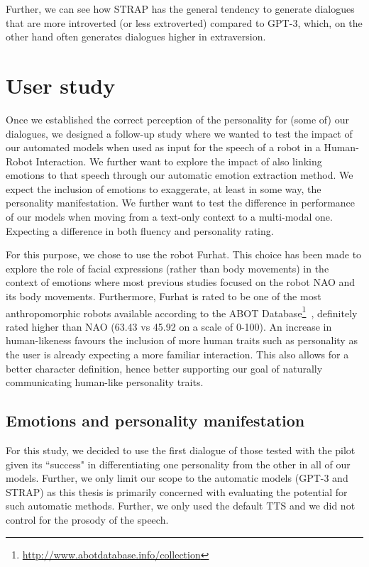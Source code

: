 \documentclass[nomenclature, english, biblatex]{kththesis}
\begin{document}
Further, we can see how STRAP has the general tendency to generate dialogues that are more introverted (or less extroverted) compared to GPT-3, which, on the other hand often generates dialogues higher in extraversion. 
\section{User study}
Once we established the correct perception of the personality for (some of) our dialogues, we designed a follow-up study where we wanted to test the impact of our automated models when used as input for the speech of a robot in a Human-Robot Interaction. We further want to explore the impact of also linking emotions to that speech through our automatic emotion extraction method. We expect the inclusion of emotions to exaggerate, at least in some way, the personality manifestation. We further want to test the difference in performance of our models when moving from a text-only context to a multi-modal one. Expecting a difference in both fluency and personality rating.

For this purpose, we chose to use the robot Furhat. This choice has been made to explore the role of facial expressions (rather than body movements) in the context of emotions where most previous studies focused on the robot NAO and its body movements. Furthermore, Furhat is rated to be one of the most anthropomorphic robots available according to the ABOT Database\footnote{\url{http://www.abotdatabase.info/collection}}~\cite{phillips2018human}, definitely rated higher than NAO (63.43 vs 45.92 on a scale of 0-100). An increase in human-likeness favours the inclusion of more human traits such as personality as the user is already expecting a more familiar interaction. This also allows for a better character definition, hence better supporting our goal of naturally communicating human-like personality traits.

\subsection{Emotions and personality manifestation}
For this study, we decided to use the first dialogue of those tested with the pilot given its ``success" in differentiating one personality from the other in all of our models. Further, we only limit our scope to the automatic models (GPT-3 and STRAP) as this thesis is primarily concerned with evaluating the potential for such automatic methods. Further, we only used the default \gls{TTS} and we did not control for the prosody of the speech.
\end{document}
